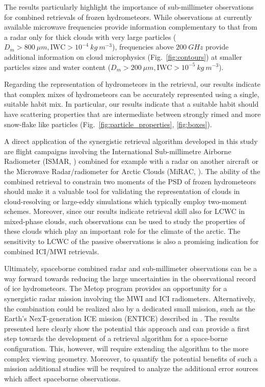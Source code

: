 \documentclass[journal abbreviation, manuscript]{copernicus}
\begin{document}
The results particularly highlight the importance of sub-millimeter observations
for combined retrievals of frozen hydrometeors. While observations at currently
available microwave frequencies provide information complementary to that from a
radar only for thick clouds with very large particles ($D_m > 800\ \unit{\mu m},
\text{IWC} > 10^{-4}\ \unit{kg\ m^{-3}}$), frequencies above $200\ \unit{GHz}$
provide additional information on cloud microphysics (Fig.~\ref{fig:contours})
at smaller particles sizes and water content ($D_m > 200\ \unit{\mu m},
\text{IWC} > 10^{-5}\ \unit{kg\ m^{-3}}$).

Regarding the representation of hydrometeors in the retrieval, our results
indicate that complex mixes of hydrometeors can be accurately represented using
a single, suitable habit mix. In particular, our results indicate that a
suitable habit should have scattering properties that are intermediate between
strongly rimed and more snow-flake like particles
(Fig.~\ref{fig:particle_properties}, \ref{fig:boxes}).

A direct application of the synergistic retrieval algorithm developed in this
study are flight campaigns involving the International Sub-millimetre Airborne
Radiometer (ISMAR, \citet{fox17}) combined for example with a radar on another
aircraft or the Microwave Radar/radiometer for Arctic Clouds (MiRAC,
\citet{mech19}). The ability of the combined retrieval to constrain two moments
of the PSD of frozen hydrometeors should make it a valuable tool for validating
the representation of clouds in cloud-resolving or large-eddy simulations which
typically employ two-moment schemes. Moreover, since our results indicate
retrieval skill also for LCWC in mixed-phase clouds, such observations can be
used to study the properties of these clouds which play an important role for
the climate of the arctic. The sensitivity to LCWC of the passive observations
is also a promising indication for combined ICI/MWI retrievals.

Ultimately, spaceborne combined radar and sub-millimeter observations can be a
way forward towards reducing the large uncertainties in the observational record
of ice hydrometeors. The Metop program provides an opportunity for a synergistic
radar mission involving the MWI and ICI radiometers. Alternatively, the
combination could be realized also by a dedicated small mission, such as the
Earth's NexT-generation ICE mission (ENTICE) described in \citet{jiang19}. The
results presented here clearly show the potential this approach and can provide
a first step towards the development of a retrieval algorithm for a space-borne
configuration. This, however, will require extending the algorithm to the more
complex viewing geometry. Moreover, to quantify the potential benefits of such a
mission additional studies will be required to analyze the additional error
sources which affect spaceborne observations.
\end{document}
